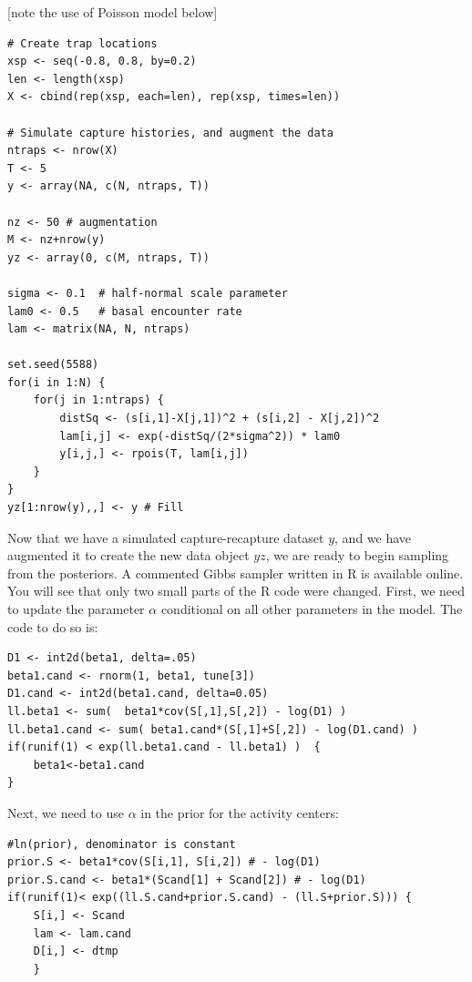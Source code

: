 [note the use of Poisson model below]

\begin{small}
\begin{verbatim}
# Create trap locations
xsp <- seq(-0.8, 0.8, by=0.2)
len <- length(xsp)
X <- cbind(rep(xsp, each=len), rep(xsp, times=len))

# Simulate capture histories, and augment the data
ntraps <- nrow(X)
T <- 5
y <- array(NA, c(N, ntraps, T))

nz <- 50 # augmentation
M <- nz+nrow(y)
yz <- array(0, c(M, ntraps, T))

sigma <- 0.1  # half-normal scale parameter
lam0 <- 0.5   # basal encounter rate
lam <- matrix(NA, N, ntraps)

set.seed(5588)
for(i in 1:N) {
    for(j in 1:ntraps) {
        distSq <- (s[i,1]-X[j,1])^2 + (s[i,2] - X[j,2])^2
        lam[i,j] <- exp(-distSq/(2*sigma^2)) * lam0
        y[i,j,] <- rpois(T, lam[i,j])
    }
}
yz[1:nrow(y),,] <- y # Fill
\end{verbatim}
\end{small}

Now that we have a simulated capture-recapture dataset $y$, and we have
augmented it to create the new data object $yz$, we are ready to
begin sampling from the posteriors. A commented Gibbs sampler written in R is
available online. You will see that only two small parts of the R code
were changed. First, we need to update the parameter $\alpha$
conditional on all other parameters in the model. The code to do so is:

\begin{small}
\begin{verbatim}
D1 <- int2d(beta1, delta=.05)
beta1.cand <- rnorm(1, beta1, tune[3])
D1.cand <- int2d(beta1.cand, delta=0.05)
ll.beta1 <- sum(  beta1*cov(S[,1],S[,2]) - log(D1) )
ll.beta1.cand <- sum( beta1.cand*(S[,1]+S[,2]) - log(D1.cand) )
if(runif(1) < exp(ll.beta1.cand - ll.beta1) )  {
    beta1<-beta1.cand
}
\end{verbatim}
\end{small}

Next, we need to use $\alpha$ in the prior for the activity centers:

\begin{small}
\begin{verbatim}
#ln(prior), denominator is constant
prior.S <- beta1*cov(S[i,1], S[i,2]) # - log(D1)
prior.S.cand <- beta1*(Scand[1] + Scand[2]) # - log(D1)
if(runif(1)< exp((ll.S.cand+prior.S.cand) - (ll.S+prior.S))) {
    S[i,] <- Scand
    lam <- lam.cand
    D[i,] <- dtmp
    }
\end{verbatim}
\end{small}

